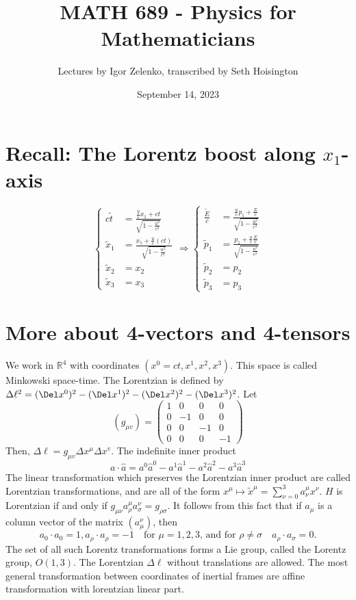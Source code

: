 \documentclass{article}
\title{MATH 689 - Physics for Mathematicians}
\author{Lectures by Igor Zelenko, transcribed by Seth Hoisington}
\date{September 14, 2023}
\newcommand{\R}{\mathbb R}
\begin{document}
\maketitle
\section{Recall: The Lorentz boost along $x_1$-axis}
\[\left\{\begin{aligned}
    c\tilde{t}&=\frac{\frac{y}{c}x_1 + ct}{\sqrt{1-\frac{u^2}{c^2}}}\\
    \tilde{x}_1&=\frac{x_1+\frac{u}{c} (ct)}{\sqrt{1-\frac{u^2}{c^2}}}\\
    \tilde{x}_2&= x_2\\
    \tilde{x}_3&= x_3
\end{aligned}\right.\Rightarrow \left\{\begin{aligned}
    \frac{\tilde E}{c}&=\frac{\frac{u}{c}p_1 + \frac{E}{c}}{\sqrt{1-\frac{u^2}{c^2}}}\\
    \tilde{p}_1&=\frac{p_1+\frac{u}{c} \frac{E}{c}}{\sqrt{1-\frac{u^2}{c^2}}}\\
    \tilde{p}_2&= p_2\\
    \tilde{p}_3&= p_3
\end{aligned}\right.\]
\section{More about 4-vectors and 4-tensors}
We work in $\R^4$ with coordinates $(x^0 = ct,x^1, x^2, x^3)$. This space is called Minkowski space-time. The Lorentzian is defined by $\Delta\ell^2  = (\Del x^0)^2 - (\Del x^1)^2 - (\Del x^2)^2-(\Del x^3)^2$. Let 
\[(g_{\mu v})=\begin{pmatrix}
    1 & 0 & 0 &0\\
    0& -1 & 0 & 0\\
    0& 0 & -1 & 0\\
    0& 0 & 0 & -1
\end{pmatrix}\]
Then, $\Delta\ell = g_{\mu v}\Delta x^\mu \Delta x^v$. The indefinite inner product
\[a\cdot\hat a = a^0\hat a^0-a^1\hat a^1- a^2\hat a^2-a^3\hat a^3\]
The linear transformation which preserves the Lorentzian inner product are called Lorentzian transformations, and are all of the form $x^\mu\mapsto \tilde x^\mu = \sum_{\nu=0}^3 a^\mu_\nu x^\nu$. $H$ is Lorentzian if and only if $g_{\mu \nu} a^\mu_\rho a^\nu_\sigma = g_{\rho\sigma}$. It follows from this fact that if $a_\mu$ is a column vector of the matrix $(a_\mu^\nu)$, then
\[a_0\cdot a_0 = 1,  a_\rho\cdot a_\rho = -1\quad\text{for $\mu = 1,2,3$, and for $\rho\neq \sigma$}\quad a_\rho\cdot a_\sigma = 0.\]
The set of all such Lorentz transformations forms a Lie group, called the Lorentz group, $O(1,3)$. The Lorentzian $\Delta\ell$ without translations are allowed. The most general transformation between coordinates of inertial frames are affine transformation with lorentzian linear part.
\end{document}
